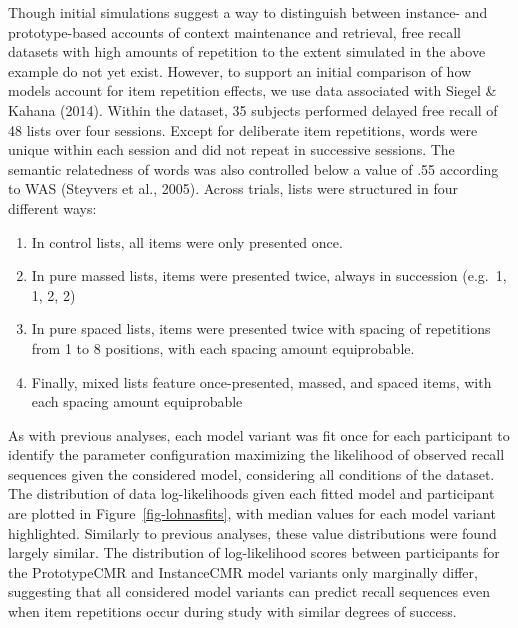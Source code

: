 \documentclass[
  letterpaper,
  DIV=11]{article}
\begin{document}
Though initial simulations suggest a way to distinguish between
instance- and prototype-based accounts of context maintenance and
retrieval, free recall datasets with high amounts of repetition to the
extent simulated in the above example do not yet exist. However, to
support an initial comparison of how models account for item repetition
effects, we use data associated with Siegel \& Kahana (2014). Within the
dataset, 35 subjects performed delayed free recall of 48 lists over four
sessions. Except for deliberate item repetitions, words were unique
within each session and did not repeat in successive sessions. The
semantic relatedness of words was also controlled below a value of .55
according to WAS (Steyvers et al., 2005). Across trials, lists were
structured in four different ways:

\begin{enumerate}
\def\labelenumi{\arabic{enumi}.}
\item
  In control lists, all items were only presented once.
\item
  In pure massed lists, items were presented twice, always in succession
  (e.g.~1, 1, 2, 2)
\item
  In pure spaced lists, items were presented twice with spacing of
  repetitions from 1 to 8 positions, with each spacing amount
  equiprobable.
\item
  Finally, mixed lists feature once-presented, massed, and spaced items,
  with each spacing amount equiprobable
\end{enumerate}

As with previous analyses, each model variant was fit once for each
participant to identify the parameter configuration maximizing the
likelihood of observed recall sequences given the considered model,
considering all conditions of the dataset. The distribution of data
log-likelihoods given each fitted model and participant are plotted in
Figure~\ref{fig-lohnasfits}, with median values for each model variant
highlighted. Similarly to previous analyses, these value distributions
were found largely similar. The distribution of log-likelihood scores
between participants for the PrototypeCMR and InstanceCMR model variants
only marginally differ, suggesting that all considered model variants
can predict recall sequences even when item repetitions occur during
study with similar degrees of success.
\end{document}
